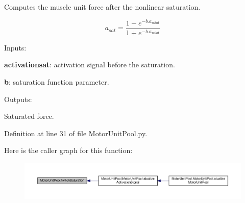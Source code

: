 Computes the muscle unit force after the nonlinear saturation. 

\begin{equation} a_{sat} = \frac{1-e^{-b.a_{nSat}}}{1+e^{-b.a_{nSat}}} \end{equation}


\begin{DoxyItemize}
\item Inputs\+:
\begin{DoxyItemize}
\item {\bfseries activationsat}\+: activation signal before the saturation.
\item {\bfseries b}\+: saturation function parameter.
\end{DoxyItemize}
\item Outputs\+:
\begin{DoxyItemize}
\item Saturated force. 
\end{DoxyItemize}
\end{DoxyItemize}

Definition at line 31 of file Motor\+Unit\+Pool.\+py.



Here is the caller graph for this function\+:\nopagebreak
\begin{figure}[H]
\begin{center}
\leavevmode
\includegraphics[width=350pt]{namespace_motor_unit_pool_aacaa939935d8190221721483670a8b5e_icgraph}
\end{center}
\end{figure}


